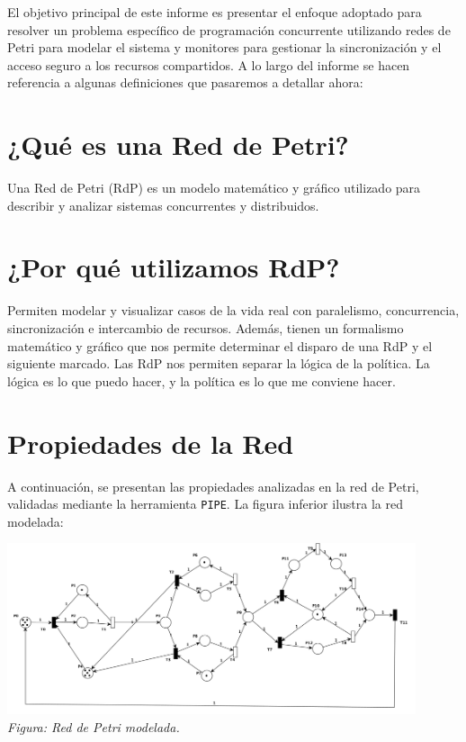 \documentclass[12pt]{article}
\begin{document}
El objetivo principal de este informe es presentar el enfoque adoptado para resolver un problema específico de programación concurrente utilizando redes de Petri para modelar el sistema y monitores para gestionar la sincronización y el acceso seguro a los recursos compartidos. A lo largo del informe se hacen referencia a algunas definiciones que pasaremos a detallar ahora:

\newpage

\section{¿Qué es una Red de Petri?}
Una Red de Petri (RdP) es un modelo matemático y gráfico utilizado para describir y analizar sistemas concurrentes y distribuidos.

\section{¿Por qué utilizamos RdP?}
Permiten modelar y visualizar casos de la vida real con paralelismo, concurrencia, sincronización e intercambio de recursos. Además, tienen un formalismo matemático y gráfico que nos permite determinar el disparo de una RdP y el siguiente marcado. Las RdP nos permiten separar la lógica de la política. La lógica es lo que puedo hacer, y la política es lo que me conviene hacer.

\section{Propiedades de la Red}
A continuación, se presentan las propiedades analizadas en la red de Petri, validadas mediante la herramienta \texttt{PIPE}. La figura inferior ilustra la red modelada:

\begin{center}
    \includegraphics[width=0.9\textwidth]{Petri-Net.png}\\[0.5em]
    \textit{Figura: Red de Petri modelada.}
\end{center}
\end{document}

